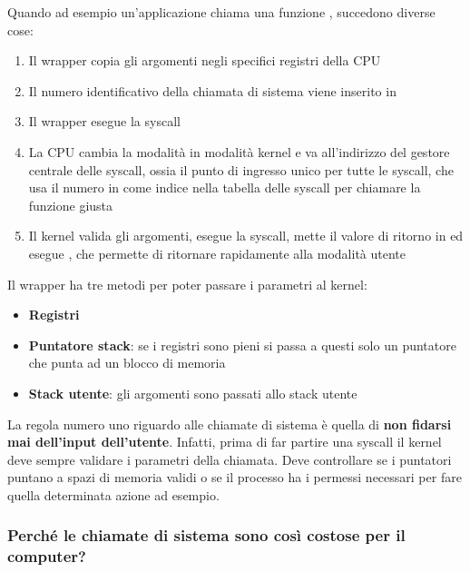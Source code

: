 \documentclass[11pt, a4paper, titlepage, oneside]{scrbook}
\begin{document}
Quando ad esempio un'applicazione chiama una funzione , succedono diverse cose:
\begin{enumerate}[label=\arabic*°]
    \item Il wrapper copia gli argomenti negli specifici registri della CPU
    \item Il numero identificativo della chiamata di sistema viene inserito in 
    \item Il wrapper esegue la syscall
    \item La CPU cambia la modalità in modalità kernel e va all'indirizzo del gestore centrale delle syscall, ossia il punto di ingresso unico per tutte le syscall, che usa il numero in  come indice nella tabella delle syscall per chiamare la funzione giusta
    \item Il kernel valida gli argomenti, esegue la syscall, mette il valore di ritorno in  ed esegue , che permette di ritornare rapidamente alla modalità utente
\end{enumerate}

Il wrapper ha tre metodi per poter passare i parametri al kernel:
\begin{itemize}
    \item \textbf{Registri}
    \item \textbf{Puntatore stack}: se i registri sono pieni si passa a questi solo un puntatore che punta ad un blocco di memoria
    \item \textbf{Stack utente}: gli argomenti sono passati allo stack utente
\end{itemize}

La regola numero uno riguardo alle chiamate di sistema è quella di \textbf{non fidarsi mai dell'input dell'utente}. Infatti, prima di far partire una syscall il kernel deve sempre validare i parametri della chiamata. Deve controllare se i puntatori puntano a spazi di memoria validi o se il processo ha i permessi necessari per fare quella determinata azione ad esempio.

\subsubsection*{Perché le chiamate di sistema sono così costose per il computer?}
\end{document}

